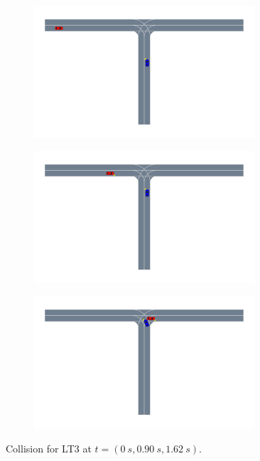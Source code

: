 \begin{figure}
    \centering
    \begin{subfigure}[t]{0.33\columnwidth}
        \centering
        \includegraphics[width=0.9\textwidth, trim={8cm 16cm 22cm 0},clip]{figures/interpretable_validation/2car_res3_frame_01.pdf}
    \end{subfigure}%
   \begin{subfigure}[t]{0.33\columnwidth}
        \centering
        \includegraphics[width=0.9\textwidth, trim={10cm 16.5cm 22cm 0},clip]{figures/interpretable_validation/2car_res3_frame_06.pdf}
    \end{subfigure}%
    \begin{subfigure}[t]{0.33\columnwidth}
        \centering
        \includegraphics[width=0.9\textwidth, trim={10cm 16.5cm 22cm 0},clip]{figures/interpretable_validation/2car_res3_frame_10.pdf}
    \end{subfigure}
    \caption{Collision for LT3 at $t=(\SI{0}{s}, \SI{0.90}{s}, \SI{1.62}{s})$.}
    \label{fig:2car_LT3}
\end{figure}

